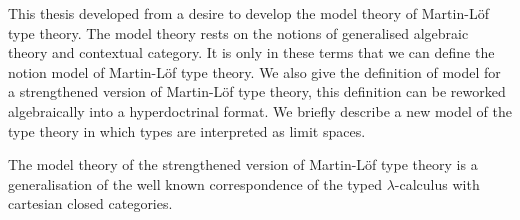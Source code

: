 This thesis developed  from a desire to develop the model theory of Martin-Löf type theory.
%
The model theory rests on the notions of generalised algebraic theory and contextual category.
%
It is only in these terms that we can define the notion model of Martin-Löf type theory.
%
We also give the definition of model for a strengthened version of Martin-Löf type theory, this definition can be reworked algebraically into a hyperdoctrinal format.
%
We briefly describe a new model of the type theory in which types are interpreted as limit spaces.

The model theory of the strengthened version of Martin-Löf type theory is a generalisation of the well known correspondence of the typed $\lambda$-calculus with cartesian closed categories.

